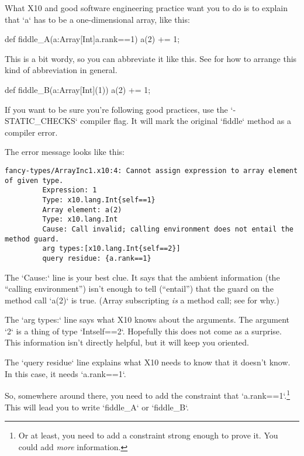 What X10 and good software engineering practice want you to do is to explain
that \xcd`a` has to be a one-dimensional array, like this:
\begin{xtennum}[]
def fiddle_A(a:Array[Int]{a.rank==1}) {
  a(2) += 1;
}
\end{xtennum}
This is a bit wordy, so you can abbreviate it like this.  See
 for how to arrange this kind of abbreviation in general. 
\begin{xtennum}[]
def fiddle_B(a:Array[Int](1)) {
  a(2) += 1;
}
\end{xtennum}
If you want to be sure you're following good practices, use the
\xcd`-STATIC_CHECKS` compiler flag.  It will mark the original \xcd`fiddle`
method as a compiler error.

The error message looks like this:
\begin{verbatim}
fancy-types/ArrayInc1.x10:4: Cannot assign expression to array element of given type.    
     	 Expression: 1    
     	 Type: x10.lang.Int{self==1}    
     	 Array element: a(2)    
     	 Type: x10.lang.Int    
     	 Cause: Call invalid; calling environment does not entail the method guard.    
     	 arg types:[x10.lang.Int{self==2}]    
     	 query residue: {a.rank==1}

\end{verbatim}
The \xcd`Cause:` line is your best clue.  It says that the ambient information
(the ``calling environment'') isn't enough to tell (``entail'') that the guard
on the method call \xcd`a(2)` is true.  
(Array subscripting {\em is} a method call; see
 for why.)  

The \xcd`arg types:` line says what X10 knows about the arguments.  The
argument \xcd`2` is a thing of type \xcd`Int{self==2}`.  Hopefully this does
not come as a surprise.  This information isn't directly helpful, but it will
keep you oriented.

The \xcd`query residue` line explains what X10 needs to know that it doesn't
know.  In this case, it needs \xcd`a.rank==1`.  

So, somewhere around there, you need to add the constraint that
\xcd`a.rank==1`.\footnote{Or at least, you need to add a constraint strong
enough to prove it.  You could add {\em more} information.}
This will lead you to write \xcd`fiddle_A` or \xcd`fiddle_B`.



